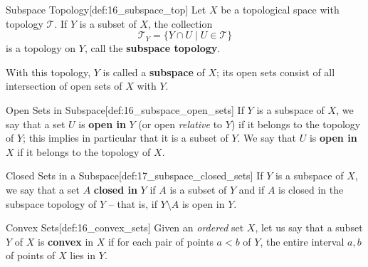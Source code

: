\begin{defBox}{Subspace Topology}[def:16_subspace_top]
    Let \( X \) be a topological space with topology \( \mathcal{T} \). If 
    \( Y \) is a subset of \( X \), the collection 
    \begin{equation*}
        \mathcal{T}_{ Y }
        =
        \{ Y \cap U \mid U \in \mathcal{T} \}
    \end{equation*}
    is a topology on \( Y \), call the \textbf{subspace topology}.
    
    \baseSkip

    With this topology, \( Y \) is called a \textbf{subspace} of \( X \);
    its open sets consist of all intersection of open sets of \( X \) with 
    \( Y \).
\end{defBox}

\begin{defBox}{Open Sets in Subspace}[def:16_subspace_open_sets]
    If \( Y \) is a subspace of \( X \), we say that a set \( U \) is 
    \textbf{open in} \( Y \) (or open \textit{relative} to \( Y \)) if it
    belongs to the topology of \( Y \);
    this implies in particular that it is a subset of \( Y \).
    We say that \( U \) is \textbf{open in} \( X \) if it belongs to the 
    topology of \( X \).
\end{defBox}

\begin{defBox}{Closed Sets in a Subspace}[def:17_subspace_closed_sets]
    If \( Y \) is a subspace of \( X \), we say that a set \( A \) 
    \textbf{closed in} \( Y \) if \( A \) is a subset of \( Y \) and if \( A \)
    is closed in the subspace topology of \( Y \) -- that is, if 
    \( Y \setminus A \) is open in \( Y \).
\end{defBox}

\begin{defBox}{Convex Sets}[def:16_convex_sets]
    Given an \textit{ordered} set \( X \), let us say that a subset \( Y \) of 
    \( X \) is \textbf{convex} in \( X \) if for each pair of points \( a < b \)
    of \( Y \), the entire interval \( a, b \) of points of \( X \) lies in 
    \( Y \).
\end{defBox}